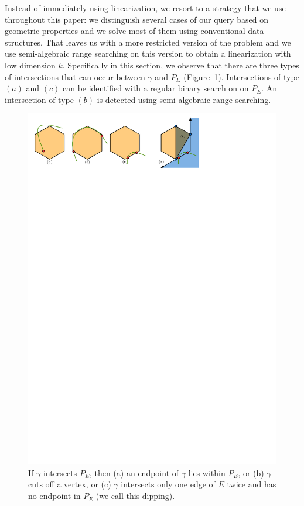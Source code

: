 \documentclass[a4paper, UKenglish]{lipics-v2018}
\begin{document}
 \noindent
Instead of immediately using linearization, we resort to a strategy that we use throughout this paper: we distinguish several cases of our query based on geometric properties and we solve most of them using conventional data structures. That leaves us with a more restricted version of the problem and we use semi-algebraic range searching on this version to obtain a linearization with low dimension $k$. 
Specifically in this section, we observe that there are three types of intersections that can occur between $\gamma$ and $P_E$ (Figure~\ref{fig:intersectionsearch}). Intersections of type $(a)$ and $(c)$ can be identified with a regular binary search on on $P_E$. An intersection of type $(b)$ is detected using semi-algebraic range searching.
%
\begin{figure}[h]
    \centering
    \includegraphics{../intersectionsearch}
    \setlength{\belowcaptionskip}{-30pt}
    \caption{If $\gamma$ intersects $P_E$, then (a) an endpoint of $\gamma$ lies within $P_E$, or (b) $\gamma$ cuts off a vertex, or (c) $\gamma$ intersects only one edge of $E$ twice and has no endpoint in $P_E$ (we call this dipping).}
    \label{fig:intersectionsearch}
\end{figure}
\end{document}
